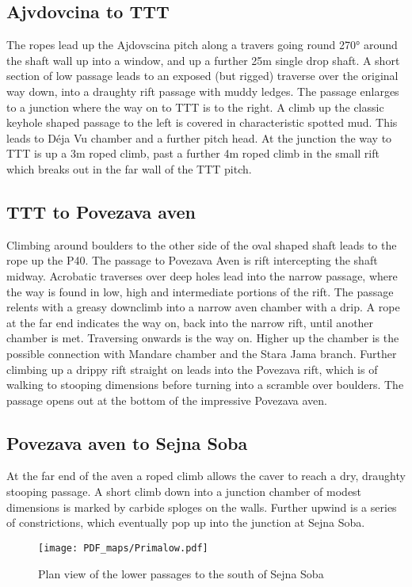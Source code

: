 \subsection{Ajvdovcina to TTT}
The ropes lead up the Ajdovscina pitch along a travers going round 270° around the shaft wall up into a window, and up a further 25m single drop shaft. A short section of low passage leads to an exposed (but rigged) traverse over the original way down, into a draughty rift passage with muddy ledges. The passage enlarges to a junction where the way on to TTT is to the right. A climb up the classic keyhole shaped passage to the left is covered in characteristic spotted mud. This leads to Déja Vu chamber and a further pitch head. At the junction the way to TTT is up a 3m roped climb, past a further 4m roped climb in the small rift which breaks out in the far wall of the TTT pitch.

\subsection{TTT to Povezava aven}
Climbing around boulders to the other side of the oval shaped shaft leads to the rope up the P40. The passage to Povezava Aven is rift intercepting the shaft midway. Acrobatic traverses over deep holes lead into the narrow passage, where the way is found in low, high and intermediate portions of the rift. The passage relents with a greasy downclimb into a narrow aven chamber with a drip. A rope at the far end indicates the way on, back into the narrow rift, until another chamber is met. Traversing onwards is the way on. Higher up the chamber is the possible connection with Mandare chamber and the Stara Jama branch. Further climbing up a drippy rift straight on leads into the Povezava rift, which is of walking to stooping dimensions before turning into a scramble over boulders. The passage opens out at the bottom of the impressive Povezava aven.

\subsection{Povezava aven to Sejna Soba}
At the far end of the aven a roped climb allows the caver to reach a dry, draughty stooping passage. A short climb down into a junction chamber of modest dimensions is marked by carbide sploges on the walls. Further upwind is a series of constrictions, which eventually pop up into the junction at Sejna Soba.




\begin{figure*}[t!]
\centering
\texttt{[image: PDF\_maps/Primalow.pdf]}
\caption{Plan view of the lower passages to the south of Sejna Soba}
\label{prima low trip}
\end{figure*}
